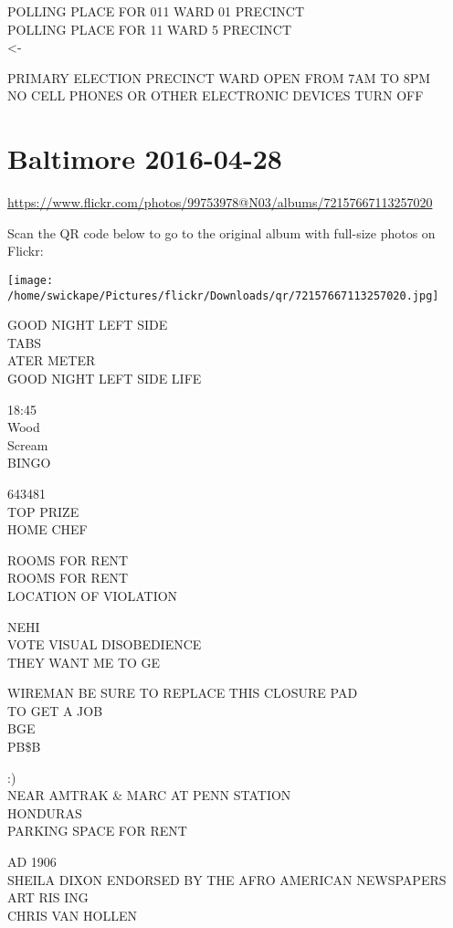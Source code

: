 \documentclass[10pt,letterpaper]{article}
\begin{document}
POLLING PLACE FOR 011 WARD 01 PRECINCT\\
POLLING PLACE FOR 11 WARD 5 PRECINCT\\
<{-}

PRIMARY ELECTION PRECINCT WARD OPEN FROM 7AM TO 8PM\\
NO CELL PHONES OR OTHER ELECTRONIC DEVICES TURN OFF
\pagebreak

\section*{Baltimore 2016-04-28}

\url{https://www.flickr.com/photos/99753978@N03/albums/72157667113257020}

Scan the QR code below to go to the original album with full-size photos on Flickr:

\texttt{[image: /home/swickape/Pictures/flickr/Downloads/qr/72157667113257020.jpg]}
\pagebreak

GOOD NIGHT LEFT SIDE\\
TABS\\
ATER METER\\
GOOD NIGHT LEFT SIDE LIFE

18:45\\
Wood\\
Scream\\
BINGO

643481\\
TOP PRIZE\\
HOME CHEF

ROOMS FOR RENT\\
ROOMS FOR RENT\\
LOCATION OF VIOLATION

NEHI\\
VOTE VISUAL DISOBEDIENCE\\
THEY WANT ME TO GE

WIREMAN BE SURE TO REPLACE THIS CLOSURE PAD\\
TO GET A JOB\\
BGE\\
PB\$B

:)\\
NEAR AMTRAK \& MARC AT PENN STATION\\
HONDURAS\\
PARKING SPACE FOR RENT

AD 1906\\
SHEILA DIXON ENDORSED BY THE AFRO AMERICAN NEWSPAPERS\\
ART RIS ING\\
CHRIS VAN HOLLEN
\end{document}
